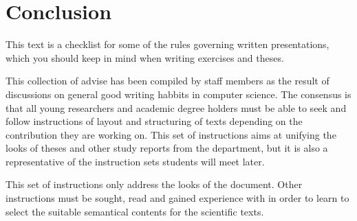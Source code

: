 \chapter{Conclusion}

This text is a checklist for some of the rules governing written presentations, which you should 
keep in mind when writing exercises and theses.

This collection of advise has been compiled by staff members as the
result of discussions on general good writing habbits in computer
science. The consensus is that all young researchers and academic degree
holders must be able to seek and follow instructions of layout and
structuring of texts depending on the contribution they are working on. 
This set of instructions aims at unifying the looks of theses and other
study reports from the department, but it is also a representative of
the instruction sets students will meet later.

This set of instructions only address the looks of the document. Other
instructions must be sought, read and gained experience with in order to
learn to select the suitable semantical contents for the scientific texts.
